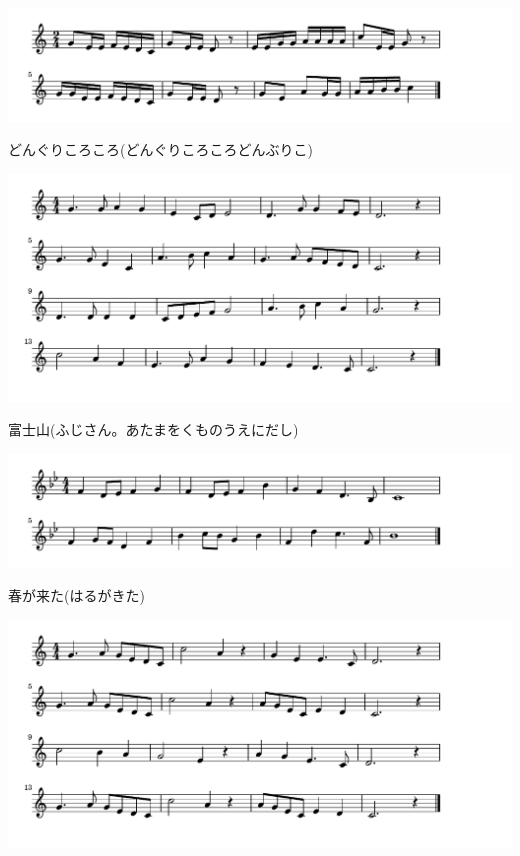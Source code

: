 \documentclass[a4paper]{ltjsarticle}
\begin{document}
\includegraphics[clip]{donguri_crop.pdf}

\vspace{-10mm} \hspace{10mm}
どんぐりころころ(どんぐりころころどんぶりこ)

\includegraphics[clip]{fujisan_crop.pdf}

\vspace{-10mm} \hspace{10mm}
富士山(ふじさん。あたまをくものうえにだし)

\includegraphics[clip]{harugakita_crop.pdf}

\vspace{-10mm} \hspace{10mm}
春が来た(はるがきた)

\includegraphics[clip]{harukaze_crop.pdf}
\end{document}
